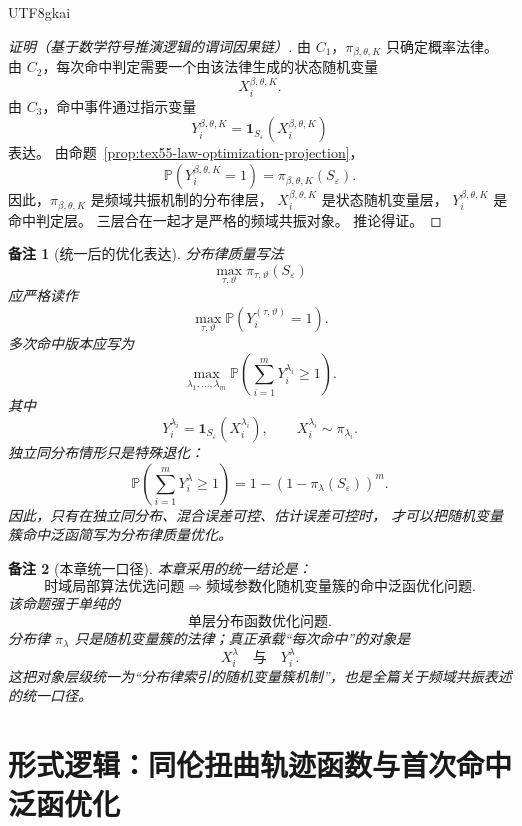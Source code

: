 \documentclass[12pt]{article}
\newtheorem{remark}{备注}[section]
\begin{document}
\begin{CJK*}{UTF8}{gkai}
\begin{proof}[证明（基于数学符号推演逻辑的谓词因果链）]
由 \(C_1\)，\(\pi_{\beta,\theta,K}\) 只确定概率法律。
由 \(C_2\)，每次命中判定需要一个由该法律生成的状态随机变量
\[
  X_i^{\beta,\theta,K}.
\]
由 \(C_3\)，命中事件通过指示变量
\[
  Y_i^{\beta,\theta,K}
  =
  \mathbf 1_{S_\varepsilon}(X_i^{\beta,\theta,K})
\]
表达。
由命题~\ref{prop:tex55-law-optimization-projection}，
\[
  \mathbb P(Y_i^{\beta,\theta,K}=1)
  =
  \pi_{\beta,\theta,K}(S_\varepsilon).
\]
因此，\(\pi_{\beta,\theta,K}\) 是频域共振机制的分布律层，
\(X_i^{\beta,\theta,K}\) 是状态随机变量层，
\(Y_i^{\beta,\theta,K}\) 是命中判定层。
三层合在一起才是严格的频域共振对象。
推论得证。
\end{proof}

\begin{remark}[统一后的优化表达]
分布律质量写法
\[
  \max_{\tau,\vartheta}\pi_{\tau,\vartheta}(S_\varepsilon)
\]
应严格读作
\[
  \boxed{
  \max_{\tau,\vartheta}
  \mathbb P\left(
  Y_i^{(\tau,\vartheta)}=1
  \right)
  }.
\]
多次命中版本应写为
\[
  \boxed{
  \max_{\lambda_1,\ldots,\lambda_m}
  \mathbb P\left(
  \sum_{i=1}^{m}Y_i^{\lambda_i}\ge1
  \right).
  }
\]
其中
\[
  Y_i^{\lambda_i}
  =
  \mathbf 1_{S_\varepsilon}(X_i^{\lambda_i}),
  \qquad
  X_i^{\lambda_i}\sim\pi_{\lambda_i}.
\]
独立同分布情形只是特殊退化：
\[
  \mathbb P\left(
  \sum_{i=1}^{m}Y_i^\lambda\ge1
  \right)
  =
  1-(1-\pi_\lambda(S_\varepsilon))^m.
\]
因此，只有在独立同分布、混合误差可控、估计误差可控时，
才可以把随机变量簇命中泛函简写为分布律质量优化。
\end{remark}

\begin{remark}[本章统一口径]
本章采用的统一结论是：
\[
  \boxed{
  \text{时域局部算法优选问题}
  \Longrightarrow
  \text{频域参数化随机变量簇的命中泛函优化问题}.
  }
\]
该命题强于单纯的
\[
  \text{单层分布函数优化问题}.
\]
分布律 \(\pi_\lambda\) 只是随机变量簇的法律；真正承载“每次命中”的对象是
\[
  \boxed{
  X_i^\lambda
  \quad\text{与}\quad
  Y_i^\lambda.
  }
\]
这把对象层级统一为“分布律索引的随机变量簇机制”，也是全篇关于频域共振表述的统一口径。
\end{remark}

\clearpage

\section{形式逻辑：同伦扭曲轨迹函数与首次命中泛函优化}
\label{sec:tex55-homotopy-twist-hitting-functional}


\end{CJK*}
\end{document}

